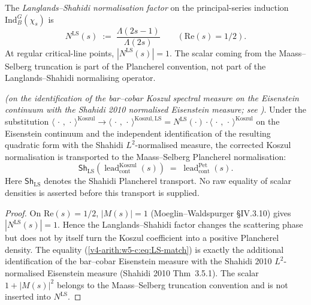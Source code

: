 \begin{definition}
\label{v4-arith:w5-c:def:LS-factor}
The \emph{Langlands--Shahidi normalisation factor} on the
principal-series induction \(\mathrm{Ind}_{B}^{G}(\chi_{s})\) is
\begin{equation}
\label{v4-arith:w5-c:eq:LS-factor}
N^{\mathrm{LS}}(s)\;:=\;\frac{\Lambda(2s-1)}{\Lambda(2s)}\qquad(\mathrm{Re}(s)=1/2).
\end{equation}
At regular critical-line points, \(|N^{\mathrm{LS}}(s)|=1\). The scalar coming from
the Maass--Selberg truncation is part of the Plancherel convention, not
part of the Langlands--Shahidi normalising operator.
\end{definition}

\begin{proposition}
\label{v4-arith:w5-c:prop:LS-absorption}
\ClaimStatusConditional \emph{(on the identification of the bar--cobar
Koszul spectral measure on the Eisenstein continuum with the Shahidi
2010 normalised Eisenstein measure; see )}. Under the substitution
\(\langle\,\cdot\,,\,\cdot\,\rangle^{\mathrm{Koszul}}\to\langle\,\cdot\,,\,\cdot\,\rangle^{\mathrm{Koszul},\mathrm{LS}}=N^{\mathrm{LS}}(\cdot)\cdot\langle\,\cdot\,,\,\cdot\,\rangle^{\mathrm{Koszul}}\)
on the Eisenstein continuum and the independent identification of the
resulting quadratic form with the Shahidi \(L^{2}\)-normalised measure,
the corrected Koszul normalisation is transported to the
Maass--Selberg Plancherel normalisation:
\begin{equation}
\label{v4-arith:w5-c:eq:LS-match}
\mathsf{Sh}_{\mathrm{LS}}\!\left(\operatorname{lead}^{\mathrm{Koszul}}_{\mathrm{cont}}(s)\right)
\;=\;\operatorname{lead}^{\mathrm{Pet}}_{\mathrm{cont}}(s).
\end{equation}
Here \(\mathsf{Sh}_{\mathrm{LS}}\) denotes the Shahidi Plancherel
transport. No raw equality of scalar densities is asserted before this
transport is supplied.
\end{proposition}

\begin{proof}
On \(\mathrm{Re}(s)=1/2\), \(|M(s)|=1\) (Moeglin--Waldspurger \S IV.3.10)
gives \(|N^{\mathrm{LS}}(s)|=1\). Hence the Langlands--Shahidi factor
changes the scattering phase but does not by itself turn the Koszul
coefficient into a positive Plancherel density. The equality
(\ref{v4-arith:w5-c:eq:LS-match}) is exactly the additional
identification of the bar--cobar Eisenstein measure with the Shahidi
2010 \(L^{2}\)-normalised Eisenstein measure (Shahidi 2010
Thm~3.5.1). The scalar \(1+|M(s)|^{2}\) belongs to the
Maass--Selberg truncation convention and is not inserted into
\(N^{\mathrm{LS}}\).
\end{proof}

